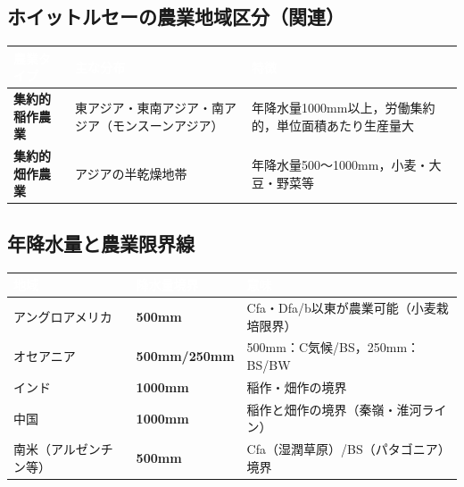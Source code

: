 \documentclass[a4paper,11pt]{article}
\newcommand{\imp}[1]{\textbf{\textcolor{mainred}{#1}}}
\newcommand{\key}[1]{\textbf{\textcolor{mainblue}{#1}}}
\begin{document}
\vspace{2mm}

\subsection{ホイットルセーの農業地域区分（関連）}

\begin{tcolorbox}[notebox, title={集約的農業：稲作 vs 畑作の比較}]
\begin{center}
\begin{tabular}{C{3.5cm}C{4cm}C{5cm}}
\toprule
{}\textcolor{white}{\textbf{農業タイプ}} & \textcolor{white}{\textbf{主な分布}} & \textcolor{white}{\textbf{特徴}} \\
\midrule
\key{集約的稲作農業} & 東アジア・東南アジア・南アジア（モンスーンアジア） & 年降水量1000mm以上，労働集約的，単位面積あたり生産量大 \\
\key{集約的畑作農業} & アジアの半乾燥地帯 & 年降水量500〜1000mm，小麦・大豆・野菜等 \\
\bottomrule
\end{tabular}
\end{center}
\end{tcolorbox}

\vspace{2mm}

\subsection{年降水量と農業限界線}

\begin{tcolorbox}[warnbox, title={🔑 年降水量の農業限界値（超重要）}]
\begin{center}
\begin{tabular}{C{3cm}C{2.5cm}C{6cm}}
\toprule
{}\textcolor{white}{\textbf{地域}} & \textcolor{white}{\textbf{降水量境界}} & \textcolor{white}{\textbf{意味}} \\
\midrule
アングロアメリカ & \imp{500mm} & Cfa・Dfa/b以東が農業可能（小麦栽培限界） \\
オセアニア & \imp{500mm/250mm} & 500mm：C気候/BS，250mm：BS/BW \\
インド & \imp{1000mm} & 稲作・畑作の境界 \\
中国 & \imp{1000mm} & 稲作と畑作の境界（秦嶺・淮河ライン） \\
南米（アルゼンチン等） & \imp{500mm} & Cfa（湿潤草原）/BS（パタゴニア）境界 \\
\bottomrule
\end{tabular}
\end{center}
\end{tcolorbox}
\end{document}
